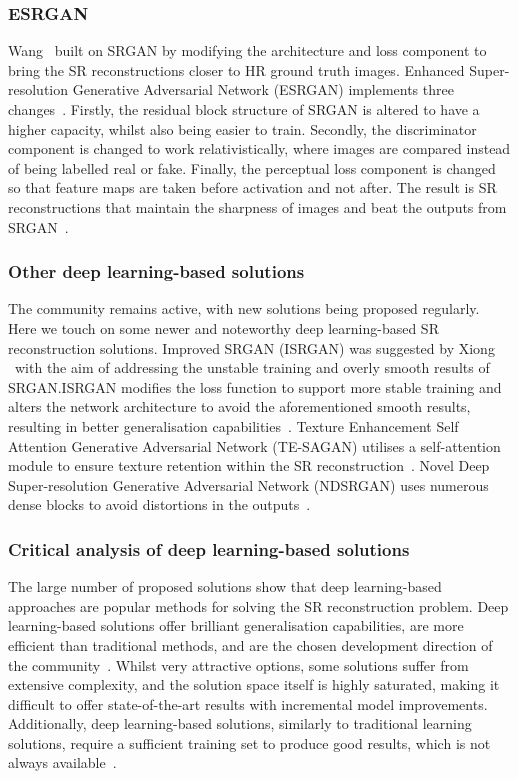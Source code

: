 \subsubsection{ESRGAN}
Wang \etal\ built on SRGAN by modifying the architecture and loss component to bring the SR reconstructions closer to HR ground truth images. Enhanced Super-resolution Generative Adversarial Network (ESRGAN) implements three changes~\cite{esrgan}. Firstly, the residual block structure of SRGAN is altered to have a higher capacity, whilst also being easier to train. Secondly, the discriminator component is changed to work relativistically, where images are compared instead of being labelled real or fake. Finally, the perceptual loss component is changed so that feature maps are taken before activation and not after. The result is SR reconstructions that maintain the sharpness of images and beat the outputs from SRGAN~\cite{esrgan}.

\subsubsection{Other deep learning-based solutions}
The community remains active, with new solutions being proposed regularly. Here we touch on some newer and noteworthy deep learning-based SR reconstruction solutions. Improved SRGAN (ISRGAN) was suggested by Xiong \etal\ with the aim of addressing the unstable training and overly smooth results of SRGAN.\@ ISRGAN modifies the loss function to support more stable training and alters the network architecture to  avoid the aforementioned smooth results, resulting in better generalisation capabilities~\cite{isrgan,remoteSensingGANsReview}. Texture Enhancement Self Attention Generative Adversarial Network (TE-SAGAN) utilises a self-attention module to ensure texture retention within the SR reconstruction~\cite{tesagan, remoteSensingGANsReview}. Novel Deep Super-resolution Generative Adversarial Network (NDSRGAN) uses numerous dense blocks to avoid distortions in the outputs~\cite{ndsrgan, remoteSensingGANsReview}. 

\subsubsection{Critical analysis of deep learning-based solutions}
The large number of proposed solutions show that deep learning-based approaches are popular methods for solving the SR reconstruction problem. Deep learning-based solutions offer brilliant generalisation capabilities, are more efficient than traditional methods, and are the chosen development direction of the community~\cite{ndsrgan}. Whilst very attractive options, some solutions suffer from extensive complexity, and the solution space itself is highly saturated, making it difficult to offer state-of-the-art results with incremental model improvements. Additionally, deep learning-based solutions, similarly to traditional learning solutions, require a sufficient training set to produce good results, which is not always available~\cite{superResRemoteSensingOverview}.

